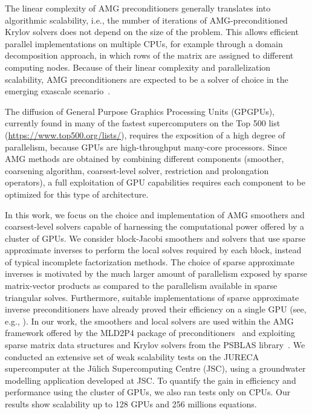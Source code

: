The linear complexity of AMG preconditioners generally
translates into algorithmic scalability, i.e., the number of iterations
of AMG-preconditioned Krylov solvers does not depend on the size of the
problem. This allows efficient parallel implementations on multiple CPUs,
for example through a domain decomposition approach, in which rows of
the matrix are assigned to different computing nodes. 
Because of their linear complexity and parallelization scalability, AMG preconditioners are expected to be a solver of choice 
in the emerging exascale scenario~\cite{Park:2015}.

The diffusion of General Purpose Graphics Processing Units (GPGPUs),
currently found in many of the fastest supercomputers on the Top 500 list
(\url{https://www.top500.org/lists/}), requires the exposition of a high
degree of parallelism, because GPUs are high-throughput many-core processors.
Since AMG methods are obtained by combining different components (smoother,
coarsening algorithm, coarsest-level solver, restriction and prolongation operators),
a full exploitation of GPU capabilities requires each component to be optimized
for this type of architecture.

In this work, we focus on the choice and implementation of AMG smoothers
and coarsest-level solvers capable of harnessing the computational power offered by
a cluster of GPUs. We consider block-Jacobi smoothers and solvers that use sparse
approximate inverses to perform the local solves required by each block, instead of typical
incomplete factorization methods. The choice of sparse approximate inverses
is motivated by the much larger amount of parallelism exposed by
sparse matrix-vector products as compared to the parallelism available
in sparse triangular solves. Furthermore, suitable implementations of sparse approximate
inverse preconditioners have already proved their efficiency on a single GPU (see, e.g.,
\cite{BERTACCINI2016693,Lukash:2012}). 
In our work, the smoothers and local solvers are used within
the AMG framework offered by the MLD2P4 package of preconditioners~\cite{Dambra:2007,mld-toms} 
and exploiting sparse matrix data structures and Krylov solvers from
the PSBLAS  library~\cite{PSBLAS3}. 
We conducted an extensive set of weak scalability tests on the JURECA supercomputer at the J\"ulich Supercomputing Centre (JSC), 
using a groundwater modelling application developed at JSC. 
To quantify the gain in efficiency and performance using the cluster of GPUs, we also ran tests only on CPUs. 
Our results show scalability up to 128 GPUs and 256 millions equations.

